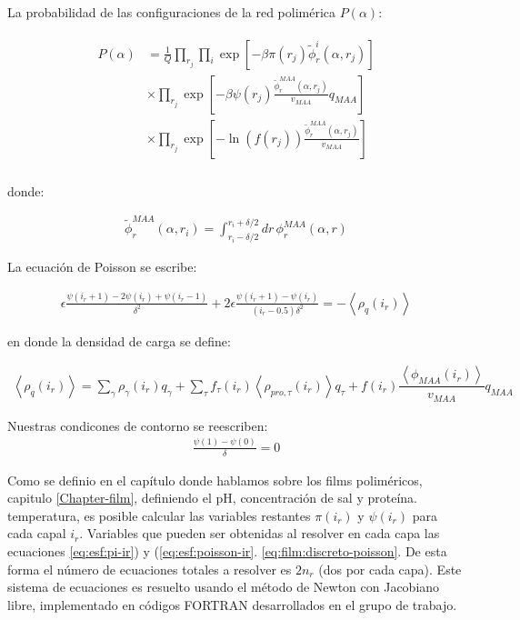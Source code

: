 La probabilidad de las configuraciones de la red polim\'erica $P(\alpha)$: 

\begin{align}
	\begin{aligned}
		P(\alpha)&= \frac{1}{Q}\prod_{r_j}\prod_i \exp\left[{- {\beta\pi(r_j) \tilde{\phi}^i_r(\alpha,r_j)}}\right] \\
		& \times \prod_{r_j} \exp \left[ - \beta \psi(r_j)\frac{\tilde{ \phi}^{MAA}_r(\alpha,r_j)}{v_{MAA}} q_{MAA}  \right] \\
		& \times \prod_{r_j} \exp\left[ - { \ln(f(r_j))\frac{\tilde{ \phi}^{MAA}_r(\alpha,r_j)}{v_{MAA}}}\right] \\
	\end{aligned}
\end{align}

\noindent donde:

\begin{align}
	\tilde{ \phi}^{MAA}_r(\alpha,r_i) = \int_{r_i -\delta/2}^{r_i + \delta/2} dr \, \phi^{MAA}_r(\alpha,r)
\end{align}

La ecuaci\'on de Poisson se escribe:

\begin{align}
	\epsilon \frac{\psi(i_r +1) -2 \psi(i_r) + \psi(i_r -1)}{\delta ^2} + 2\epsilon \frac{\psi(i_r +1) -\psi(i_r)}{(i_r -0.5)\delta ^2}= -\left<\rho_q(i_r)\right>
	\label{eq:esf:poisson-ir}
\end{align}

\noindent en donde la densidad de carga se define:

\begin{align}
	\left<\rho_q(i_r)\right> = \sum_{\gamma } {\rho_\gamma(i_r) q_\gamma + \sum_\tau{f_\tau(i_r) \left<\rho_{pro,\tau}(i_r)\right> q_\tau} +  f(i_r)\dfrac{\left<\phi_{MAA}(i_r)\right>}{v_{MAA}}q_{MAA}}
\end{align}

Nuestras condicones de contorno se reescriben:
\begin{align}
	\frac{\psi(1) - \psi(0)}{\delta} = 0
\end{align}

Como se definio en el cap\'itulo donde hablamos sobre los films polim\'ericos, capitulo \ref{Chapter-film}, definiendo  el pH, concentraci\'on de sal y prote\'ina. temperatura, es posible calcular las variables restantes  $\pi(i_r)$ y $\psi(i_r)$ para cada capal $i_r$.
Variables que pueden ser obtenidas al resolver en cada capa las ecuaciones \ref{eq:esf:pi-ir}) y (\ref{eq:esf:poisson-ir}. \ref{eq:film:discreto-poisson}.
De esta forma el n\'umero de ecuaciones totales a resolver es $2n_r$ (dos por cada capa). 
Este sistema de ecuaciones es resuelto usando el m\'etodo de Newton con Jacobiano libre, implementado en c\'odigos FORTRAN desarrollados en el grupo de trabajo.
